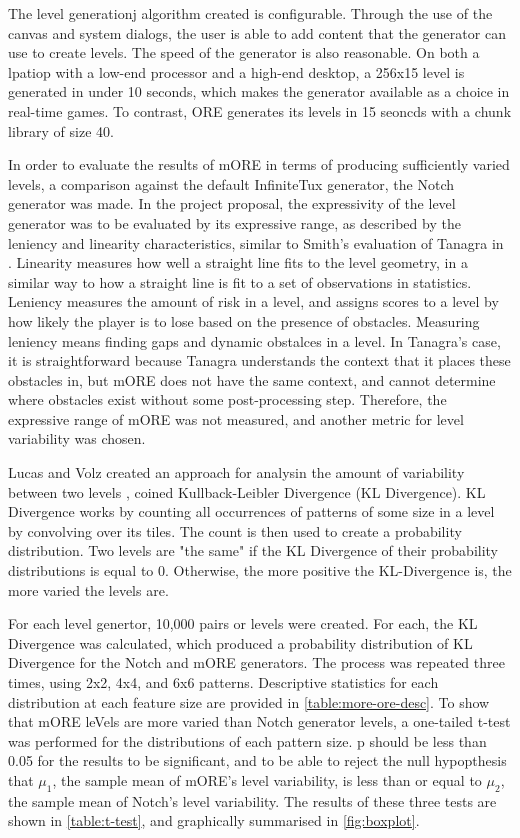 The level generationj algorithm created is configurable. Through the use of the canvas
and system dialogs, the user is able to add content that the generator can use to create
levels. The speed of the generator is also reasonable. On both a lpatiop with a low-end
processor and a high-end desktop, a 256x15 level is generated in under 10 seconds, which
makes the generator available as a choice in real-time games. To contrast, ORE generates
its levels in 15 seoncds with a chunk library of size 40.

In order to evaluate the results of mORE in terms of producing sufficiently varied levels,
a comparison against the default InfiniteTux generator, the Notch generator was made. In the
project proposal, the expressivity of the level generator was to be evaluated by its 
expressive range, as described by the leniency and linearity characteristics, similar to
Smith's evaluation of Tanagra in \cite{smith2010}. Linearity measures how well a straight
line fits to the level geometry, in a similar way to how a straight line is fit to a set of
observations in statistics. Leniency measures the amount of risk in a level, and assigns
scores to a level by how likely the player is to lose based on the presence of obstacles.
Measuring leniency means finding gaps and dynamic obstalces in a level. In Tanagra's case,
it is straightforward because Tanagra understands the context that it places these
obstacles in, but mORE does not have the same context, and cannot determine where obstacles
exist without some post-processing step. Therefore, the expressive range of mORE was not
measured, and another metric for level variability was chosen.

Lucas and Volz created an approach for analysin the amount of variability between two levels
\cite{lucas2019}, coined Kullback-Leibler Divergence (KL Divergence). KL Divergence works by
counting all  occurrences of patterns of some size in a level by convolving over its tiles.
The count is then used to create a probability distribution. Two levels are "the same"
if the KL Divergence of their probability distributions is equal to 0. Otherwise, the more
positive the KL-Divergence is, the more varied the levels are.

For each level genertor, 10,000 pairs or levels were created. For each, the KL Divergence
was calculated, which produced a probability distribution of KL Divergence for the
Notch and mORE generators. The process was repeated three times, using 2x2, 4x4, and 6x6
patterns. Descriptive statistics for each distribution at each feature size are provided
in \autoref{table:more-ore-desc}. To show that mORE leVels are more varied than Notch
generator levels, a one-tailed t-test was performed for the distributions of each pattern
size. p should be less than 0.05 for the results to be significant, and to be able to
reject the null hypopthesis that $\mu_1$, the sample mean of mORE's level variability, is less
than or equal to $\mu_2$, the sample mean of Notch's level variability. The results of these
three tests are shown in \autoref{table:t-test}, and graphically summarised in 
\autoref{fig:boxplot}. 

